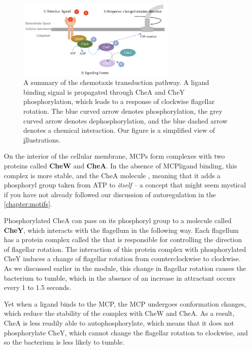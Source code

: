 \begin{figure}[h]
\centering
\mySfFamily
\includegraphics[width = 0.7\textwidth]{../images/chemotaxisphosnew.png}
\caption{A summary of the chemotaxis transduction pathway. A ligand binding signal is propagated through CheA and CheY phosphorylation, which leads to a response of clockwise flagellar rotation. The blue curved arrow denotes phosphorylation, the grey curved arrow denotes dephosphorylation, and the blue dashed arrow denotes a chemical interaction. Our figure is a simplified view of \href{http://chemotaxis.biology.utah.edu/Parkinson_Lab/projects/ecolichemotaxis/ecolichemotaxis.html"} illustrations.}
\label{fig:chemotaxisphosnew.png}
\end{figure}


On the interior of the cellular membrane, MCPs form complexes with two proteins called \textbf{CheW} and \textbf{CheA}. In the absence of MCP\-ligand binding, this complex is more stable, and the CheA molecule , meaning that it adds a phosphoryl group taken from ATP to \textit{itself} -- a concept that might seem mystical if you have not already followed our discussion of autoregulation in the \autoref{chapter:motifs}.

Phosphorylated CheA can pass on its phosphoryl group to a molecule called \textbf{CheY}, which interacts with the flagellum in the following way. Each flagellum has a protein complex called the  that is responsible for controlling the direction of flagellar rotation. The interaction of this protein complex with phosphorylated CheY induces a change of flagellar rotation from counter\-clockwise to clockwise. As we discussed earlier in the module, this change in flagellar rotation causes the bacterium to tumble, which in the absence of an increase in attractant occurs every 1 to 1.5 seconds.

Yet when a ligand binds to the MCP, the MCP undergoes conformation changes, which reduce the stability of the complex with CheW and CheA. As a result, CheA is less readily able to autophosphorylate, which means that it does not phosphorylate CheY, which cannot change the flagellar rotation to clockwise, and so the bacterium is less likely to tumble.

